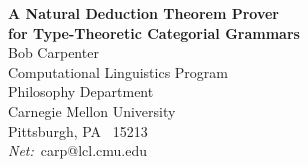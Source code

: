 \newlength{\expwidth}
\newlength{\exmarkwidth}
\newenvironment{example}%
  {\begin{equation}%
   \setlength{\exwidth}{\textwidth}%
   \settowidth{\exmarkwidth}{(\theequation)}
   \addtolength{\exwidth}{-\exmarkwidth}
   \addtolength{\exwidth}{-1.25em}
   \hfill
   \begin{minipage}[t]{\exwidth}%
  }%
  {\end{minipage}%
   \end{equation}}

\newenvironment{exampleref}[1]%
  {\begin{equation}\label{#1}%
   \setlength{\exwidth}{\textwidth}%
   \settowidth{\exmarkwidth}{(\theequation)}
   \addtolength{\exwidth}{-\exmarkwidth}
   \addtolength{\exwidth}{-1.25em}
   \hfill
   \begin{minipage}[t]{\exwidth}%
  }%
  {\end{minipage}\vspace*{6pt}%
   \end{equation}}


\newenvironment{examples}%
 {  \begin{list}%
          {\rm\alph{subexamplectr}.}%
          {\usecounter{subexamplectr}%
           \setlength{\labelwidth}{1em}%
           \setlength{\leftmargin}{1em}%
           \setlength{\itemsep}{-2pt}
           \setlength{\rightmargin}{0pt}}%
 }%
 {  \end{list}%
 }

\newenvironment{mathexamples}%
 {  \begin{list}%
          {\rm\alph{subexamplectr}.}%
          {\usecounter{subexamplectr}%
           \setlength{\labelwidth}{1em}%
           \setlength{\leftmargin}{1em}%
           \setlength{\itemsep}{+2pt}
           \setlength{\rightmargin}{0pt}}%
 }%
 {  \end{list}%
 }




\begin{center}
  {\LARGE\bf  A Natural Deduction Theorem Prover 
           \\[8pt]
           for Type-Theoretic Categorial Grammars}
  \\[20pt]
  {\Large  Bob Carpenter } 
  \\[8pt]
  Computational Linguistics Program \\
  Philosophy Department \\
  Carnegie Mellon University \\
  Pittsburgh, PA \ 15213 \\[3pt]
  {\it Net:}\ carp@lcl.cmu.edu
\end{center}

